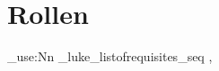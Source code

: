 \pagebreak

\setcounter{section}{-1}
\section{Rollen}
\usehyperlinkstrue
\ListOfPersons
\ListOfRequisites



\ExplSyntaxOn
\seq_use:Nn \g_luke_listofrequisites_seq {,~} %
\ExplSyntaxOff






